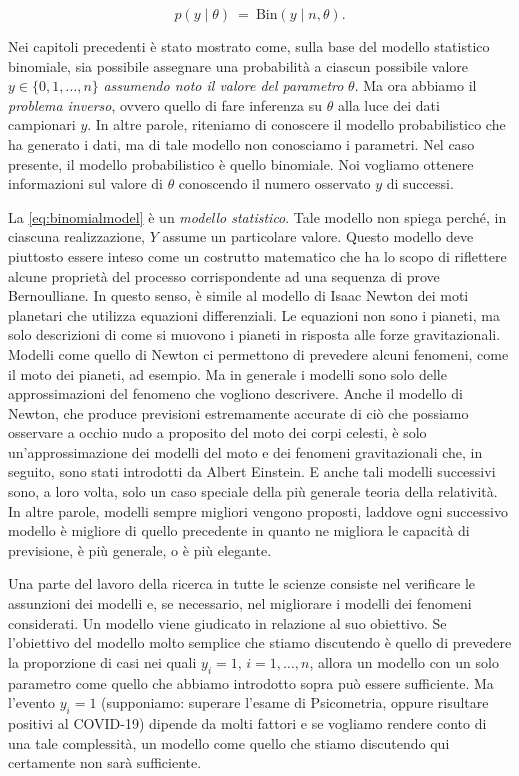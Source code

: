 \documentclass[
]{memoir}
\theoremstyle{definition}
\theoremstyle{definition}
\theoremstyle{definition}
\theoremstyle{definition}
\theoremstyle{remark}
\begin{document}
\[
p(y \mid \theta)
\ = \
\mbox{Bin}(y \mid n, \theta).
\]

Nei capitoli precedenti è stato mostrato come, sulla base del modello statistico binomiale, sia possibile assegnare una probabilità a ciascun possibile valore \(y \in \{0, 1, \dots, n\}\) \emph{assumendo noto il valore del parametro} \(\theta\). Ma ora abbiamo il \emph{problema inverso}, ovvero quello di fare inferenza su \(\theta\) alla luce dei dati campionari \(y\). In altre parole, riteniamo di conoscere il modello probabilistico che ha generato i dati, ma di tale modello non conosciamo i parametri. Nel caso presente, il modello probabilistico è quello binomiale. Noi vogliamo ottenere informazioni sul valore di \(\theta\) conoscendo il numero osservato \(y\) di successi.

La \eqref{eq:binomialmodel} è un \emph{modello statistico}. Tale modello non spiega perché, in ciascuna realizzazione, \(Y\) assume un particolare valore. Questo modello deve piuttosto essere inteso come un costrutto matematico che ha lo scopo di riflettere alcune proprietà del processo corrispondente ad una sequenza di prove Bernoulliane. In questo senso, è simile al modello di Isaac Newton dei moti planetari che utilizza equazioni differenziali. Le equazioni non sono i pianeti, ma solo descrizioni di come si muovono i pianeti in risposta alle forze gravitazionali. Modelli come quello di Newton ci permettono di prevedere alcuni fenomeni, come il moto dei pianeti, ad esempio. Ma in generale i modelli sono solo delle approssimazioni del fenomeno che vogliono descrivere. Anche il modello di Newton, che produce previsioni estremamente accurate di ciò che possiamo osservare a occhio nudo a proposito del moto dei corpi celesti, è solo un'approssimazione dei modelli del moto e dei fenomeni gravitazionali che, in seguito, sono stati introdotti da Albert Einstein. E anche tali modelli successivi sono, a loro volta, solo un caso speciale della più generale teoria della relatività. In altre parole, modelli sempre migliori vengono proposti, laddove ogni successivo modello è migliore di quello precedente in quanto ne migliora le capacità di previsione, è più generale, o è più elegante.

Una parte del lavoro della ricerca in tutte le scienze consiste nel verificare le assunzioni dei modelli e, se necessario, nel migliorare i modelli dei fenomeni considerati. Un modello viene giudicato in relazione al suo obiettivo. Se l'obiettivo del modello molto semplice che stiamo discutendo è quello di prevedere la proporzione di casi nei quali \(y_i = 1\), \(i = 1, \dots, n\), allora un modello con un solo parametro come quello che abbiamo introdotto sopra può essere sufficiente. Ma l'evento \(y_i=1\) (supponiamo: superare l'esame di Psicometria, oppure risultare positivi al COVID-19) dipende da molti fattori e se vogliamo rendere conto di una tale complessità, un modello come quello che stiamo discutendo qui certamente non sarà sufficiente.
\end{document}
